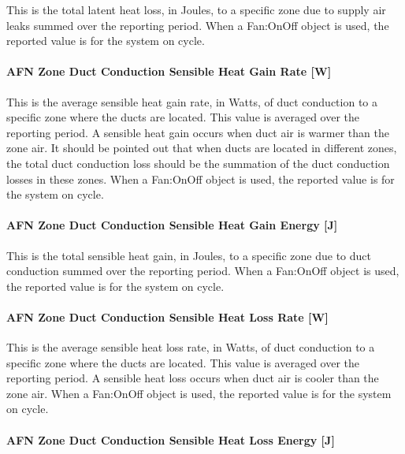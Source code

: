 This is the total latent heat loss, in Joules, to a specific zone due to supply air leaks summed over the reporting period. When a Fan:OnOff object is used, the reported value is for the system on cycle.

\paragraph{AFN Zone Duct Conduction Sensible Heat Gain Rate {[}W{]}}\label{afn-zone-duct-conduction-sensible-heat-gain-rate-w}

This is the average sensible heat gain rate, in Watts, of duct conduction to a specific zone where the ducts are located. This value is averaged over the reporting period. A sensible heat gain occurs when duct air is warmer than the zone air. It should be pointed out that when ducts are located in different zones, the total duct conduction loss should be the summation of the duct conduction losses in these zones. When a Fan:OnOff object is used, the reported value is for the system on cycle.

\paragraph{AFN Zone Duct Conduction Sensible Heat Gain Energy {[}J{]}}\label{afn-zone-duct-conduction-sensible-heat-gain-energy-j}

This is the total sensible heat gain, in Joules, to a specific zone due to duct conduction summed over the reporting period. When a Fan:OnOff object is used, the reported value is for the system on cycle.

\paragraph{AFN Zone Duct Conduction Sensible Heat Loss Rate {[}W{]}}\label{afn-zone-duct-conduction-sensible-heat-loss-rate-w}

This is the average sensible heat loss rate, in Watts, of duct conduction to a specific zone where the ducts are located. This value is averaged over the reporting period. A sensible heat loss occurs when duct air is cooler than the zone air. When a Fan:OnOff object is used, the reported value is for the system on cycle.

\paragraph{AFN Zone Duct Conduction Sensible Heat Loss Energy {[}J{]}}\label{afn-zone-duct-conduction-sensible-heat-loss-energy-j}

